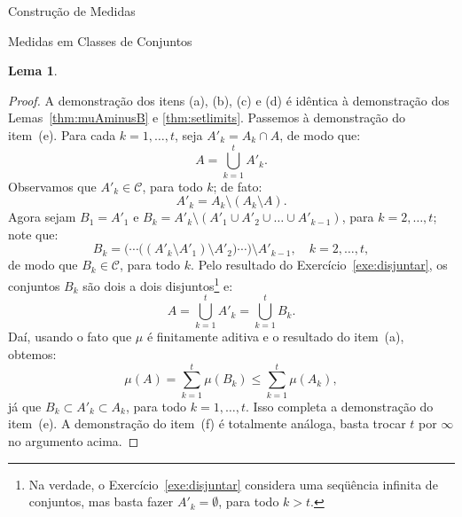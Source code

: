 \documentclass[oneside,final,11pt]{amsbook}
\theoremstyle{remark}\newtheorem{exercise}{Exercício}[chapter]
\theoremstyle{remark}\newtheorem{*exercise}[exercise]{\hbox to 0pt{\hskip 0pt minus 1fil*}Exercício}
\theoremstyle{definition}\newtheorem{exdefin}{Definição}[chapter]
\theoremstyle{plain}\newtheorem{teo}{Teorema}[section]
\theoremstyle{plain}\newtheorem{lem}[teo]{Lema}
\theoremstyle{plain}\newtheorem{prop}[teo]{Proposição}
\theoremstyle{plain}\newtheorem{cor}[teo]{Corolário}
\theoremstyle{definition}\newtheorem{defin}[teo]{Definição}
\theoremstyle{remark}\newtheorem{rem}[teo]{Observação}
\theoremstyle{definition}\newtheorem{notation}[teo]{Notação}
\theoremstyle{definition}\newtheorem{convention}[teo]{Convenção}
\theoremstyle{definition}\newtheorem{example}[teo]{Exemplo}
\numberwithin{section}{chapter}
\numberwithin{equation}{section}
\begin{document}
\begin{chapter}{Construção de Medidas}
\begin{section}{Medidas em Classes de Conjuntos}
\begin{lem}
\end{lem}
\begin{proof}
A demonstração dos itens (a), (b), (c) e (d) é idêntica à demonstração dos Lemas~\ref{thm:muAminusB} e \ref{thm:setlimits}.
Passemos à demonstração do item~(e). Para cada $k=1,\ldots,t$, seja $A'_k=A_k\cap A$, de modo que:
\[A=\bigcup_{k=1}^tA'_k.\]
Observamos que $A'_k\in\mathcal C$, para todo $k$; de fato:
\[A'_k=A_k\setminus(A_k\setminus A).\]
Agora sejam $B_1=A'_1$ e $B_k=A'_k\setminus(A'_1\cup A'_2\cup\ldots\cup A'_{k-1})$, para $k=2,\ldots,t$; note que:
\[B_k=\big(\cdots\big((A'_k\setminus A'_1)\setminus A'_2\big)\cdots\big)\setminus A'_{k-1},\quad k=2,\ldots,t,\]
de modo que $B_k\in\mathcal C$, para todo $k$. Pelo resultado do Exercício~\ref{exe:disjuntar}, os conjuntos $B_k$ são
dois a dois disjuntos\footnote{%
Na verdade, o Exercício~\ref{exe:disjuntar} considera uma seqüência infinita de conjuntos, mas basta fazer
$A'_k=\emptyset$, para todo $k>t$.} e:
\[A=\bigcup_{k=1}^tA'_k=\bigcup_{k=1}^tB_k.\]
Daí, usando o fato que $\mu$ é finitamente aditiva e o resultado do item~(a), obtemos:
\[\mu(A)=\sum_{k=1}^t\mu(B_k)\le\sum_{k=1}^t\mu(A_k),\]
já que $B_k\subset A'_k\subset A_k$, para todo $k=1,\ldots,t$. Isso completa a demonstração do item~(e). A demonstração
do item~(f) é totalmente análoga, basta trocar $t$ por $\infty$ no argumento acima.
\end{proof}


\end{section}
\end{chapter}
\end{document}
